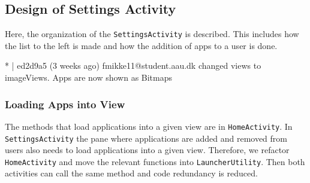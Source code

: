 \subsection{Design of Settings Activity}\label{sec:sprint3:designsettings}

Here, the organization of the \lstinline!SettingsActivity! is described.
This includes how the list to the left is made and how the addition of apps to a user is done. 



* | ed2d9a5 (3 weeks ago) fmikke11@student.aau.dk changed views to imageViews. Apps are now shown as Bitmaps\\ 

\subsubsection{Loading Apps into View}\label{sec:sprint:designlauncher}

The methods that load applications into a given view are in \lstinline!HomeActivity!.
In \lstinline!SettingsActivity! the pane where applications are added and removed from users also needs to load applications into a given view.
Therefore, we refactor \lstinline!HomeActivity! and move the relevant functions into \lstinline!LauncherUtility!.
Then both activities can call the same method and code redundancy is reduced. 
